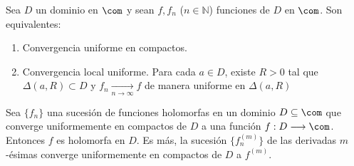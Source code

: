 \begin{lema}
Sea $D$ un dominio en $\com$ y sean $f,f_n$ ($n \in \mathbb{N}$) funciones de $D$ en $\com$. Son equivalentes:
\begin{enumerate}
    \item Convergencia uniforme en compactos.
    \item Convergencia local uniforme. Para cada $a \in D$, existe $R > 0$ tal que $\Delta(a,R) \subset D$ y $f_n \xrightarrow[n \to \infty]{} f$ de manera uniforme en $\Delta(a,R)$
\end{enumerate}
\end{lema}

\begin{teo}
Sea $\{f_n\}$ una sucesión de funciones holomorfas en un dominio $D \subseteq \com$ que converge uniformemente en compactos de $D$ a una función $f: D \longrightarrow \com$. Entonces $f$ es holomorfa en $D$. Es más, la sucesión $\{f_n^{(m)}\}$ de las derivadas $m$-ésimas converge uniformemente en compactos de $D$ a $f^{(m)}$.
\end{teo}

